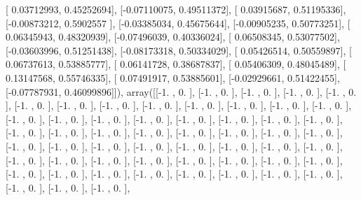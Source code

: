 \documentclass{article}
\begin{document}
       [ 0.03712993,  0.45252694],
       [-0.07110075,  0.49511372],
       [ 0.03915687,  0.51195336],
       [-0.00873212,  0.5902557 ],
       [-0.03385034,  0.45675644],
       [-0.00905235,  0.50773251],
       [ 0.06345943,  0.48320939],
       [-0.07496039,  0.40336024],
       [ 0.06508345,  0.53077502],
       [-0.03603996,  0.51251438],
       [-0.08173318,  0.50334029],
       [ 0.05426514,  0.50559897],
       [ 0.06737613,  0.53885777],
       [ 0.06141728,  0.38687837],
       [ 0.05406309,  0.48045489],
       [ 0.13147568,  0.55746335],
       [ 0.07491917,  0.53885601],
       [-0.02929661,  0.51422455],
       [-0.07787931,  0.46099896]]), array([[-1.        ,  0.        ],
       [-1.        ,  0.        ],
       [-1.        ,  0.        ],
       [-1.        ,  0.        ],
       [-1.        ,  0.        ],
       [-1.        ,  0.        ],
       [-1.        ,  0.        ],
       [-1.        ,  0.        ],
       [-1.        ,  0.        ],
       [-1.        ,  0.        ],
       [-1.        ,  0.        ],
       [-1.        ,  0.        ],
       [-1.        ,  0.        ],
       [-1.        ,  0.        ],
       [-1.        ,  0.        ],
       [-1.        ,  0.        ],
       [-1.        ,  0.        ],
       [-1.        ,  0.        ],
       [-1.        ,  0.        ],
       [-1.        ,  0.        ],
       [-1.        ,  0.        ],
       [-1.        ,  0.        ],
       [-1.        ,  0.        ],
       [-1.        ,  0.        ],
       [-1.        ,  0.        ],
       [-1.        ,  0.        ],
       [-1.        ,  0.        ],
       [-1.        ,  0.        ],
       [-1.        ,  0.        ],
       [-1.        ,  0.        ],
       [-1.        ,  0.        ],
       [-1.        ,  0.        ],
       [-1.        ,  0.        ],
       [-1.        ,  0.        ],
       [-1.        ,  0.        ],
       [-1.        ,  0.        ],
       [-1.        ,  0.        ],
       [-1.        ,  0.        ],
       [-1.        ,  0.        ],
       [-1.        ,  0.        ],
       [-1.        ,  0.        ],
       [-1.        ,  0.        ],
       [-1.        ,  0.        ],
       [-1.        ,  0.        ],
       [-1.        ,  0.        ],
       [-1.        ,  0.        ],
       [-1.        ,  0.        ],
       [-1.        ,  0.        ],
       [-1.        ,  0.        ],
       [-1.        ,  0.        ],
       [-1.        ,  0.        ],
       [-1.        ,  0.        ],
       [-1.        ,  0.        ],
       [-1.        ,  0.        ],
       [-1.        ,  0.        ],
       [-1.        ,  0.        ],
\end{document}

